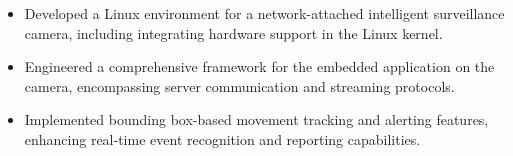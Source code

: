 \begin{itemize}
  \item Developed a Linux environment for a network-attached intelligent surveillance camera, including integrating hardware support in the Linux kernel.
  \item Engineered a comprehensive framework for the embedded application on the camera, encompassing server communication and streaming protocols.
  \item Implemented bounding box-based movement tracking and alerting features, enhancing real-time event recognition and reporting capabilities.
\end{itemize}
\divider
